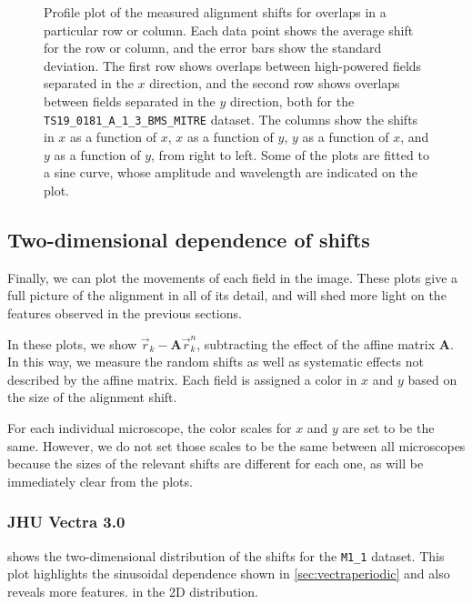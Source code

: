 \documentclass{article}
\newcommand{\matrixbold}[1]{\mathbf{#1}}
\newcommand{\M}[2]{\texttt{M#1\_#2}}
\begin{document}
\begin{figure}[ht]
\begin{subfigure}{0.24\linewidth}
		\caption{}
		\label{fig:sinewave4yyAKY}
	\end{subfigure}
	\caption{Profile plot of the measured alignment shifts for overlaps in a particular row or column.  Each data point shows the average shift for the row or column, and the error bars show the standard deviation.  The first row shows overlaps between high-powered fields separated in the $x$ direction, and the second row shows overlaps between fields separated in the $y$ direction, both for the \texttt{TS19\_0181\_A\_1\_3\_BMS\_MITRE} dataset.  The columns show the shifts in $x$ as a function of $x$, $x$ as a function of $y$, $y$ as a function of $x$, and $y$ as a function of $y$, from right to left.  Some of the plots are fitted to a sine curve, whose amplitude and wavelength are indicated on the plot.}
	\label{fig:sinewavesAKY}
\end{figure}

\clearpage

\subsection{Two-dimensional dependence of shifts}

Finally, we can plot the movements of each field in the image.  These plots give a full picture of the alignment in all of its detail, and will shed more light on the features observed in the previous sections.

In these plots, we show $\vec{r}_k-\matrixbold{A}\vec{r}_k^n$, subtracting the effect of the affine matrix $\matrixbold{A}$.  In this way, we measure the random shifts as well as systematic effects not described by the affine matrix.  Each field is assigned a color in $x$ and $y$ based on the size of the alignment shift.

For each individual microscope, the color scales for $x$ and $y$ are set to be the same.  However, we do not set those scales to be the same between all microscopes because the sizes of the relevant shifts are different for each one, as will be immediately clear from the plots.

\subsubsection{JHU Vectra 3.0}

 shows the two-dimensional distribution of the shifts for the \M11 dataset.  This plot highlights the sinusoidal dependence shown in \cref{sec:vectraperiodic} and also reveals more features. in the 2D distribution.
\end{document}
